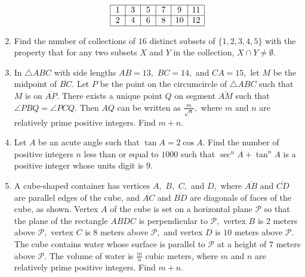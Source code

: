 \documentclass{article}
\begin{document}
\begin{enumerate}[label=\arabic*., itemsep=0.5em]
\begin{equation*}
\begin{array}{|c|c|c|c|c|c|} \hline
\,1\, & \,3\, & \,5\, & \,7\, & \,9\, & 11 \\ \hline
\,2\, & \,4\, & \,6\, & \,8\, & 10 & 12 \\ \hline
\end{array}
\end{equation*}
\par \vspace{0.5em}\item Find the number of collections of \(16\) distinct subsets of \(\{1,2,3,4,5\}\) with the property that for any two subsets \(X\) and \(Y\) in the collection, \(X \cap Y \not= \emptyset.\)\par \vspace{0.5em}\item In \(\triangle ABC\) with side lengths \(AB = 13,\) \(BC = 14,\) and \(CA = 15,\) let \(M\) be the midpoint of \(\overline{BC}.\) Let \(P\) be the point on the circumcircle of \(\triangle ABC\) such that \(M\) is on \(\overline{AP}.\) There exists a unique point \(Q\) on segment \(\overline{AM}\) such that \(\angle PBQ = \angle PCQ.\) Then \(AQ\) can be written as \(\frac{m}{\sqrt{n}},\) where \(m\) and \(n\) are relatively prime positive integers. Find \(m+n.\)\par \vspace{0.5em}\item Let \(A\) be an acute angle such that \(\tan A = 2 \cos A.\) Find the number of positive integers \(n\) less than or equal to \(1000\) such that \(\sec^n A + \tan^n A\) is a positive integer whose units digit is \(9.\)\par \vspace{0.5em}\item A cube-shaped container has vertices \(A,\) \(B,\) \(C,\) and \(D,\) where \(\overline{AB}\) and \(\overline{CD}\) are parallel edges of the cube, and \(\overline{AC}\) and \(\overline{BD}\) are diagonals of faces of the cube, as shown. Vertex \(A\) of the cube is set on a horizontal plane \(\mathcal{P}\) so that the plane of the rectangle \(ABDC\) is perpendicular to \(\mathcal{P},\) vertex \(B\) is \(2\) meters above \(\mathcal{P},\) vertex \(C\) is \(8\) meters above \(\mathcal{P},\) and vertex \(D\) is \(10\) meters above \(\mathcal{P}.\) The cube contains water whose surface is parallel to \(\mathcal{P}\) at a height of \(7\) meters above \(\mathcal{P}.\) The volume of water is \(\frac{m}{n}\) cubic meters, where \(m\) and \(n\) are relatively prime positive integers. Find \(m+n.\)


\end{enumerate}
\end{document}
